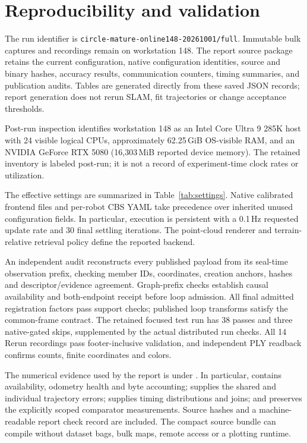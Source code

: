 \section{Reproducibility and validation}
\label{sec:reproducibility}
The run identifier is \texttt{circle-mature-online148-20261001/full}. Immutable bulk captures and recordings remain on workstation 148. The report source package retains the current configuration, native configuration identities, source and binary hashes, accuracy results, communication counters, timing summaries, and publication audits. Tables are generated directly from these saved JSON records; report generation does not rerun SLAM, fit trajectories or change acceptance thresholds.

Post-run inspection identifies workstation 148 as an Intel Core Ultra 9 285K host with 24 visible logical CPUs, approximately 62.25\,GiB OS-visible RAM, and an NVIDIA GeForce RTX 5080 (16,303\,MiB reported device memory). The retained inventory is labeled post-run; it is not a record of experiment-time clock rates or utilization.

The effective settings are summarized in Table~\ref{tab:settings}. Native calibrated frontend files and per-robot CBS YAML take precedence over inherited unused configuration fields. In particular, execution is persistent with a 0.1\,Hz requested update rate and 30 final settling iterations. The point-cloud renderer and terrain-relative retrieval policy define the reported backend.


An independent audit reconstructs every published payload from its seal-time observation prefix, checking member IDs, coordinates, creation anchors, hashes and descriptor/evidence agreement. Graph-prefix checks establish causal availability and both-endpoint receipt before loop admission. All final admitted registration factors pass support checks; published loop transforms satisfy the common-frame contract. The retained focused test run has 38 passes and three native-gated skips, supplemented by the actual distributed run checks. All 14 Rerun recordings pass footer-inclusive validation, and independent PLY readback confirms counts, finite coordinates and colors.

The numerical evidence used by the report is under . In particular,  contains availability, odometry health and byte accounting;  supplies the shared and individual trajectory errors;  supplies timing distributions and joins; and  preserves the explicitly scoped comparator measurements. Source hashes and a machine-readable report check record are included. The compact source bundle can compile without dataset bags, bulk maps, remote access or a plotting runtime.

